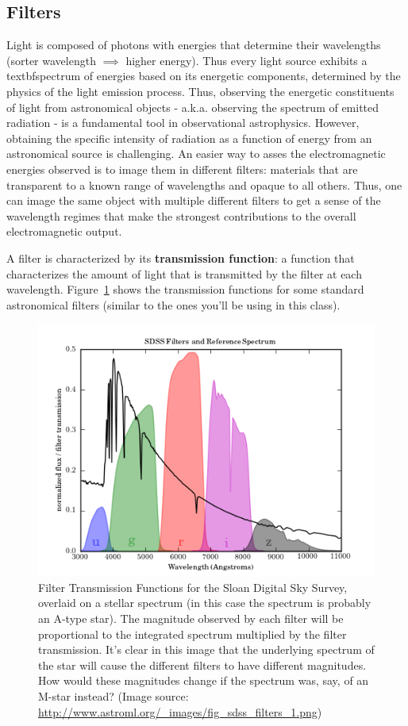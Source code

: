 \subsection{Filters}
Light is composed of photons with energies that determine their wavelengths (sorter wavelength $\implies$ higher energy). Thus every light source exhibits a textbf{spectrum} of energies based on its energetic components, determined by the physics of the light emission process. Thus, observing the energetic constituents of light from astronomical objects - a.k.a. observing the spectrum of emitted radiation - is a fundamental tool in observational astrophysics. However, obtaining the specific intensity of radiation as a function of energy from an astronomical source is challenging. An easier way to asses the electromagnetic energies observed is to image them in different filters: materials that are transparent to a known range of wavelengths and opaque to all others. Thus, one can image the same object with multiple different filters to get a sense of the wavelength regimes that make the strongest contributions to the overall electromagnetic output. 

A filter is characterized by its \textbf{transmission function}: a function that characterizes the amount of light that is transmitted by the filter at each wavelength. Figure~\ref{sot:fig:filters} shows the transmission functions for some standard astronomical filters (similar to the ones you'll be using in this class).

\begin{figure}
	\centering
	\includegraphics{small-optical-telescopes/fig_sdss_filters_1.png}
	\caption{Filter Transmission Functions for the Sloan Digital Sky Survey, overlaid on a stellar spectrum (in this case the spectrum is probably an
		A-type star). The magnitude observed by each filter will be proportional to the integrated spectrum multiplied by the filter transmission. It's clear in this image that the underlying spectrum of the star will cause the different filters to have different magnitudes. How would these magnitudes change if the spectrum was, say, of an M-star instead? (Image source: \url{http://www.astroml.org/\_images/fig\_sdss\_filters\_1.png})}\label{sot:fig:filters}
\end{figure}

